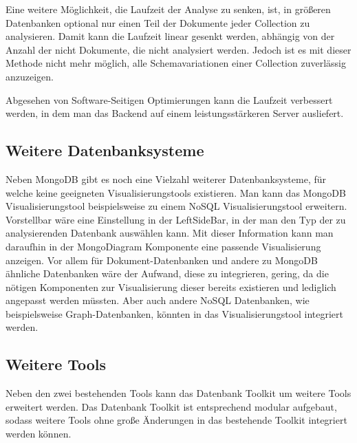 Eine weitere Möglichkeit, die Laufzeit der Analyse zu senken, ist, in größeren Datenbanken optional nur einen Teil der Dokumente jeder Collection zu analysieren.
Damit kann die Laufzeit linear gesenkt werden, abhängig von der Anzahl der nicht Dokumente, die nicht analysiert werden.
Jedoch ist es mit dieser Methode nicht mehr möglich, alle Schemavariationen einer Collection zuverlässig anzuzeigen.

Abgesehen von Software-Seitigen Optimierungen kann die Laufzeit verbessert werden, in dem man das Backend auf einem leistungsstärkeren Server ausliefert.

\subsection{Weitere Datenbanksysteme}
\label{sub:ausblick_weitere_dbs}

Neben MongoDB gibt es noch eine Vielzahl weiterer Datenbanksysteme, für welche keine geeigneten Visualisierungstools existieren.
Man kann das MongoDB Visualisierungstool beispielsweise zu einem NoSQL Visualisierungstool erweitern.
Vorstellbar wäre eine Einstellung in der LeftSideBar, in der man den Typ der zu analysierenden Datenbank auswählen kann.
Mit dieser Information kann man daraufhin in der MongoDiagram Komponente eine passende Visualisierung anzeigen.
Vor allem für Dokument-Datenbanken und andere zu MongoDB ähnliche Datenbanken wäre der Aufwand, diese zu integrieren, gering, da die nötigen Komponenten zur Visualisierung dieser bereits existieren und lediglich angepasst werden müssten.
Aber auch andere NoSQL Datenbanken, wie beispielsweise Graph-Datenbanken, könnten in das Visualisierungstool integriert werden.

\subsection{Weitere Tools}
\label{sub:ausblick_tools}

Neben den zwei bestehenden Tools kann das Datenbank Toolkit um weitere Tools erweitert werden.
Das Datenbank Toolkit ist entsprechend modular aufgebaut, sodass weitere Tools ohne große Änderungen in das bestehende Toolkit integriert werden können.
